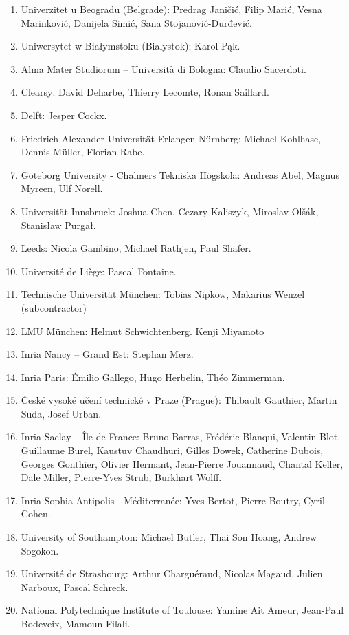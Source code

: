 \begin{enumerate}
\item Univerzitet u Beogradu (Belgrade): Predrag Janičić, Filip Marić, Vesna Marinković, Danijela Simić, Sana Stojanović-Đurđević.
\item Uniwersytet w Białymstoku (Bialystok): Karol Pąk.
\item Alma Mater Studiorum – Università di Bologna: Claudio Sacerdoti.
\item Clearsy: David Deharbe, Thierry Lecomte, Ronan Saillard.
\item Delft: Jesper Cockx.
\item Friedrich-Alexander-Universität Erlangen-Nürnberg: Michael Kohlhase, Dennis Müller, Florian Rabe.
\item G\"oteborg University - Chalmers Tekniska H\"ogskola: Andreas Abel, Magnus Myreen, Ulf Norell.
\item Universität Innsbruck: Joshua Chen, Cezary Kaliszyk, Miroslav Olšák, Stanisław Purgał.
\item Leeds: Nicola Gambino, Michael Rathjen, Paul Shafer.
\item Université de Liège: Pascal Fontaine.
\item Technische Universität München: Tobias Nipkow, Makarius Wenzel (subcontractor)
\item LMU München: Helmut Schwichtenberg. Kenji Miyamoto 
\item Inria Nancy – Grand Est: Stephan Merz.
\item Inria Paris: Émilio Gallego, Hugo Herbelin, Théo Zimmerman.
\item České vysoké učení technické v Praze (Prague): Thibault Gauthier, Martin Suda, Josef Urban.
\item Inria Saclay – Île de France: Bruno Barras, Frédéric Blanqui, Valentin Blot, Guillaume Burel, Kaustuv Chaudhuri, Gilles Dowek, Catherine Dubois, Georges Gonthier, Olivier Hermant, Jean-Pierre Jouannaud, Chantal Keller, Dale Miller, Pierre-Yves Strub, Burkhart Wolff.
\item Inria Sophia Antipolis - Méditerranée: Yves Bertot, Pierre Boutry, Cyril Cohen.
\item University of Southampton: Michael Butler, Thai Son Hoang, Andrew Sogokon.
\item Université de Strasbourg: Arthur Charguéraud, Nicolas Magaud, Julien Narboux, Pascal Schreck.
\item National Polytechnique Institute of Toulouse: Yamine Ait Ameur, Jean-Paul Bodeveix, Mamoun Filali. 
\end{enumerate}

